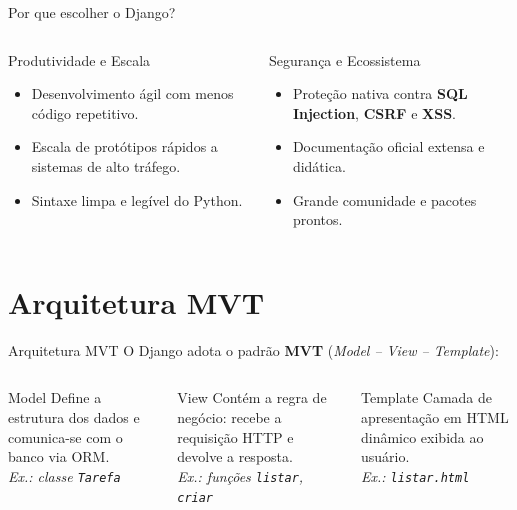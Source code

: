 \documentclass[aspectratio=169, 11pt]{beamer}
\begin{document}
\begin{frame}{Por que escolher o Django?}
  \begin{columns}[T]
    \begin{block}{Produtividade e Escala}
      \begin{itemize}
        \item Desenvolvimento ágil com menos código repetitivo.
        \item Escala de protótipos rápidos a sistemas de alto tráfego.
        \item Sintaxe limpa e legível do Python.
      \end{itemize}
    \end{block}

    \begin{block}{Segurança e Ecossistema}
      \begin{itemize}
        \item Proteção nativa contra \textbf{SQL Injection}, \textbf{CSRF} e \textbf{XSS}.
        \item Documentação oficial extensa e didática.
        \item Grande comunidade e pacotes prontos.
      \end{itemize}
    \end{block}
  \end{columns}
\end{frame}

\section{Arquitetura MVT}

\begin{frame}{Arquitetura MVT}
  O Django adota o padrão \textbf{MVT} (\textit{Model -- View -- Template}):
  \vspace{0.3cm}

  \begin{columns}[T]
    \begin{block}{Model}
      Define a estrutura dos dados e comunica-se com o banco via ORM.\\[4pt]
      \footnotesize\textit{Ex.: classe \texttt{Tarefa}}
    \end{block}

    \begin{block}{View}
      Contém a regra de negócio: recebe a requisição HTTP e devolve a resposta.\\[4pt]
      \footnotesize\textit{Ex.: funções \texttt{listar}, \texttt{criar}}
    \end{block}

    \begin{block}{Template}
      Camada de apresentação em HTML dinâmico exibida ao usuário.\\[4pt]
      \footnotesize\textit{Ex.: \texttt{listar.html}}
    \end{block}
  \end{columns}
\end{frame}
\end{document}
